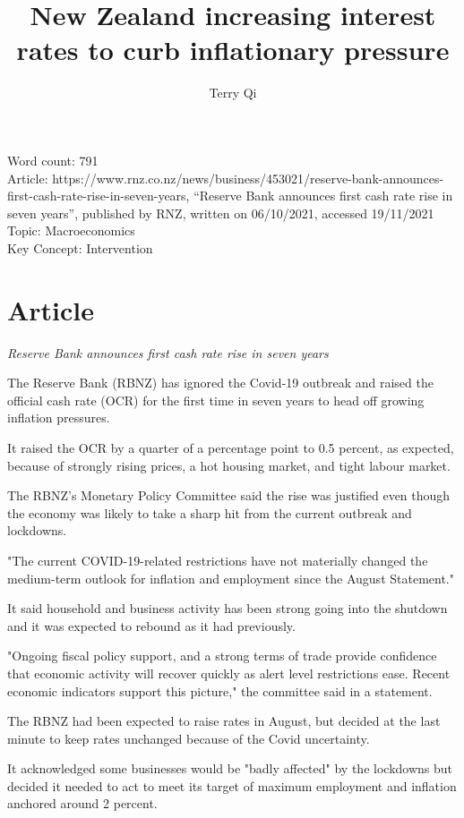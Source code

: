 \documentclass[a4paper,12pt]{article}
\title{New Zealand increasing interest rates to curb inflationary pressure}
\author{Terry Qi}
\begin{document}
\maketitle

Word count: 791\\
Article: https://www.rnz.co.nz/news/business/453021/reserve-bank-announces-first-cash-rate-rise-in-seven-years, ``Reserve Bank announces first cash rate rise in seven years'', published by RNZ, written on 06/10/2021, accessed 19/11/2021\\
Topic: Macroeconomics\\
Key Concept: Intervention

\newpage

\section*{Article}

\textit{Reserve Bank announces first cash rate rise in seven years}

The Reserve Bank (RBNZ) has ignored the Covid-19 outbreak and raised the official cash rate (OCR) for the first time in seven years to head off growing inflation pressures.

It raised the OCR by a quarter of a percentage point to 0.5 percent, as expected, because of strongly rising prices, a hot housing market, and tight labour market.

The RBNZ's Monetary Policy Committee said the rise was justified even though the economy was likely to take a sharp hit from the current outbreak and lockdowns.

"The current COVID-19-related restrictions have not materially changed the medium-term outlook for inflation and employment since the August Statement."

It said household and business activity has been strong going into the shutdown and it was expected to rebound as it had previously.

"Ongoing fiscal policy support, and a strong terms of trade provide confidence that economic activity will recover quickly as alert level restrictions ease. Recent economic indicators support this picture," the committee said in a statement.

The RBNZ had been expected to raise rates in August, but decided at the last minute to keep rates unchanged because of the Covid uncertainty.

It acknowledged some businesses would be "badly affected" by the lockdowns but decided it needed to act to meet its target of maximum employment and inflation anchored around 2 percent.
\end{document}
